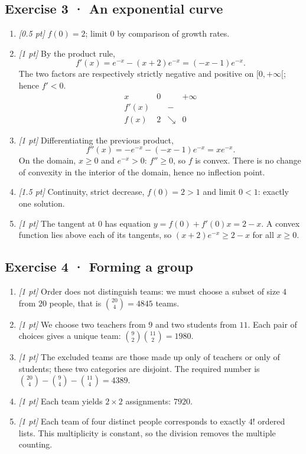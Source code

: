 \subsection*{Exercise 3 · An exponential curve}\begin{enumerate}

\item \textit{[0.5 pt]} $f(0)=2$; limit $0$ by comparison of growth rates.

\item \textit{[1 pt]} By the product rule,
\[f'(x)=e^{-x}-(x+2)e^{-x}=(-x-1)e^{-x}.\]
The two factors are respectively strictly negative and positive on $[0,+\infty[$; hence $f'<0$.
\[\begin{array}{c|ccc}x&0&&+\infty\\\hline f'(x)&&-&\\\hline f(x)&2&\searrow&0\end{array}\]

\item \textit{[1 pt]} Differentiating the previous product,
\[f''(x)=-e^{-x}-(-x-1)e^{-x}=xe^{-x}.\]
On the domain, $x\ge0$ and $e^{-x}>0$: $f''\ge0$, so $f$ is convex. There is no change of convexity in the interior of the domain, hence no inflection point.

\item \textit{[1.5 pt]} Continuity, strict decrease, $f(0)=2>1$ and limit $0<1$: exactly one solution.

\item \textit{[1 pt]} The tangent at $0$ has equation $y=f(0)+f'(0)x=2-x$. A convex function lies above each of its tangents, so $(x+2)e^{-x}\ge 2-x$ for all $x\ge0$.

\end{enumerate}

\subsection*{Exercise 4 · Forming a group}\begin{enumerate}

\item \textit{[1 pt]} Order does not distinguish teams: we must choose a subset of size $4$ from $20$ people, that is $\binom{20}4=4845$ teams.

\item \textit{[1 pt]} We choose two teachers from $9$ and two students from $11$. Each pair of choices gives a unique team: $\binom{9}2\binom{11}2=1980$.

\item \textit{[1 pt]} The excluded teams are those made up only of teachers or only of students; these two categories are disjoint. The required number is $\binom{20}4-\binom{9}4-\binom{11}4=4389$.

\item \textit{[1 pt]} Each team yields $2\times2$ assignments: $7920$.

\item \textit{[1 pt]} Each team of four distinct people corresponds to exactly $4!$ ordered lists. This multiplicity is constant, so the division removes the multiple counting.

\end{enumerate}

